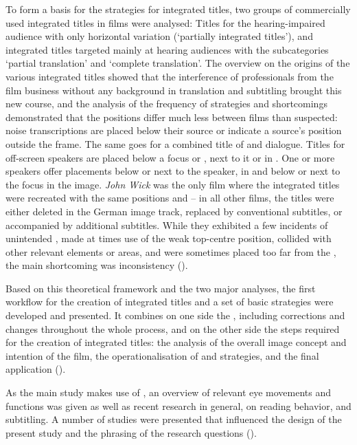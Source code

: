 To form a basis for the  strategies for integrated titles, two groups of commercially used integrated titles in films were analysed: Titles for the hearing-impaired audience with only horizontal variation (‘partially integrated titles’), and integrated titles targeted mainly at hearing audiences with the subcategories ‘partial translation’ and ‘complete translation’. The overview on the origins of the various integrated titles showed that the interference of professionals from the film business without any background in translation and subtitling brought this new course, and the analysis of the frequency of  strategies and shortcomings demonstrated that the positions differ much less between films than suspected: noise transcriptions are placed below their source or indicate a source’s position outside the frame. The same goes for a combined title of  and dialogue. Titles for off-screen speakers are placed below a focus or , next to it or in . One or more speakers offer placements below or next to the speaker, in  and below or next to the focus in the image. \textit{John Wick} was the only film where the integrated titles were recreated with the same positions and  – in all other films, the titles were either deleted in the German image track, replaced by conventional subtitles, or accompanied by additional subtitles. While they exhibited a few incidents of unintended , made at times use of the weak top-centre position, collided with other relevant elements or areas, and were sometimes placed too far from the , the main shortcoming was inconsistency ().

Based on this theoretical framework and the two major analyses, the first workflow for the creation of integrated titles and a set of basic  strategies were developed and presented. It combines on one side the , including corrections and changes throughout the whole process, and on the other side the steps required for the creation of integrated titles: the analysis of the overall image concept and intention of the film, the operationalisation of  and  strategies, and the final application ().

As the main study makes use of , an overview of relevant eye movements and functions was given as well as recent  research in general, on reading behavior, and subtitling. A number of studies were presented that influenced the design of the present study and the phrasing of the research questions ().

